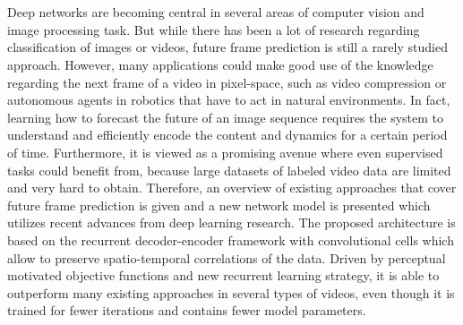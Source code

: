 \chapter{\abstractname}

Deep networks are becoming central in several areas of computer vision and image processing task. But while there has been a lot of research regarding classification of images or videos, future frame prediction is still a rarely studied approach. However, many applications could make good use of the knowledge regarding the next frame of a video in pixel-space, such as video compression or autonomous agents in robotics that have to act in natural environments. In fact, learning how to forecast the future of an image sequence requires the system to understand and efficiently encode the content and dynamics for a certain period of time. Furthermore, it is viewed as a promising avenue where even supervised tasks could benefit from, because large datasets of labeled video data are limited and very hard to obtain. Therefore, an overview of existing approaches that cover future frame prediction is given and a new network model is presented which utilizes recent advances from deep learning research. The proposed architecture is based on the recurrent decoder-encoder framework with convolutional cells which allow to preserve spatio-temporal correlations of the data. Driven by perceptual motivated objective functions and new recurrent learning strategy, it is able to outperform many existing approaches in several types of videos, even though it is trained for fewer iterations and contains fewer model parameters.